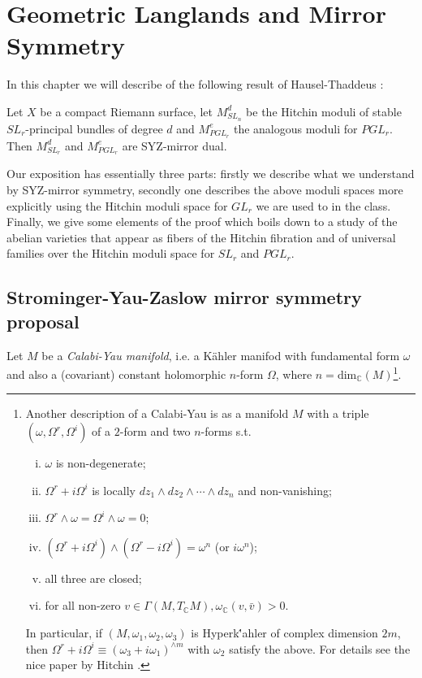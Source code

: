 
\chapter{Geometric Langlands and Mirror Symmetry}

In this chapter we will describe of the following result of
Hausel-Thaddeus \cite[Theorem 3.7]{HT}:
\begin{thm}
Let $X$ be a compact Riemann surface, let $M^d_{SL_n}$ be the Hitchin
moduli of stable $SL_r$-principal bundles of degree $d$ and
$M^e_{PGL_r}$ the analogous moduli for $PGL_r$. Then $M^d_{SL_r}$ and
$M^e_{PGL_r}$ are SYZ-mirror dual.
\end{thm}

Our exposition has essentially three parts: firstly we describe what
we understand by SYZ-mirror symmetry, secondly one describes the above
moduli spaces more explicitly using the Hitchin moduli space for
$GL_r$ we are used to in the class. Finally, we give some elements of
the proof which boils down to a study of the abelian varieties that
appear as fibers of the Hitchin fibration and of universal families
over the Hitchin moduli space for $SL_r$ and $PGL_r$.

\section{Strominger-Yau-Zaslow mirror symmetry proposal}

Let $M$ be a \emph{Calabi-Yau manifold}, i.e. a K\"ahler manifod with
fundamental form $\omega$ and also a (covariant) constant holomorphic
$n$-form $\Omega$, where $n=\mbox{dim}_{\mathbb{C}}(M)$\footnote{Another
  description of a Calabi-Yau is as a manifold $M$ with a triple
  $(\omega,\Omega^r,\Omega^i)$ of a $2$-form and two $n$-forms s.t.
\begin{enumerate}[(i)]
\item $\omega$ is non-degenerate;
\item $\Omega^r + i\Omega^i$ is locally $dz_1\wedge dz_2
  \wedge\cdots\wedge dz_n$ and non-vanishing;
\item $\Omega^r\wedge\omega=\Omega^i\wedge\omega =0$;
\item
  $\left(\Omega^r+i\Omega^i\right)\wedge\left(\Omega^r-i\Omega^i\right)=\omega^n$
(or $i\omega^n$);
\item all three are closed;
\item for all non-zero $v\in \Gamma(M,T_{\mathbb{C}}M),
  \omega_{\mathbb{C}}(v,\bar{v})>0$. 
\end{enumerate}
In particular, if
  $(M,\omega_1,\omega_2,\omega_3)$ is Hyperk\''ahler of complex
  dimension $2m$, then $\Omega^r+i\Omega^i \equiv
  \left(\omega_3+i\omega_1\right)^{\wedge m}$ with $\omega_2$ satisfy
  the above. For details see the nice paper by Hitchin \cite{H4}.}.

